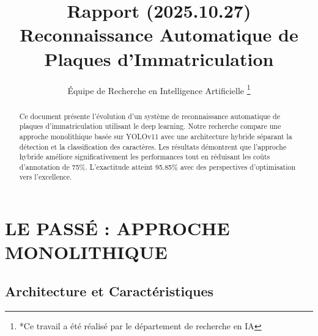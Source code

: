 \documentclass[letterpaper, 10 pt, conference]{ieeeconf}  %
\title{\LARGE \bf
Rapport (2025.10.27) Reconnaissance Automatique de Plaques d'Immatriculation
}
\author{Équipe de Recherche en Intelligence Artificielle%
\thanks{*Ce travail a été réalisé par le département de recherche en IA}%
}
\begin{document}
\maketitle
\thispagestyle{empty}
\pagestyle{empty}

\begin{abstract}

Ce document présente l'évolution d'un système de reconnaissance automatique de plaques d'immatriculation utilisant le deep learning. Notre recherche compare une approche monolithique basée sur YOLOv11 avec une architecture hybride séparant la détection et la classification des caractères. Les résultats démontrent que l'approche hybride améliore significativement les performances tout en réduisant les coûts d'annotation de 75\%. L'exactitude atteint 95.85\% avec des perspectives d'optimisation vers l'excellence.

\end{abstract}




\section{LE PASSÉ : APPROCHE MONOLITHIQUE}

\subsection{Architecture et Caractéristiques}
\end{document}
